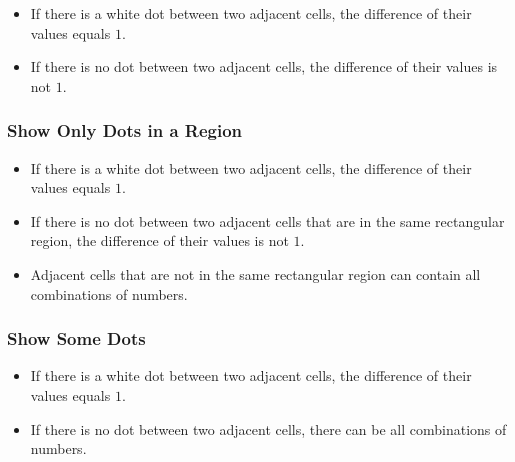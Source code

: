 \begin{itemize}
    \item If there is a white dot between two adjacent cells, the difference of their values equals $1$.
    \item If there is no dot between two adjacent cells, the difference of their values is not $1$.
\end{itemize}


\subsubsection*{Show Only Dots in a Region}

\begin{itemize}
    \item If there is a white dot between two adjacent cells, the difference of their values equals $1$.
    \item If there is no dot between two adjacent cells that are in the same rectangular region,
            the difference of their values is not $1$.
    \item Adjacent cells that are not in the same rectangular region can contain all combinations of numbers.
\end{itemize}


\subsubsection*{Show Some Dots}

\begin{itemize}
    \item If there is a white dot between two adjacent cells, the difference of their values equals $1$.
    \item If there is no dot between two adjacent cells, there can be all combinations of numbers.
\end{itemize}



